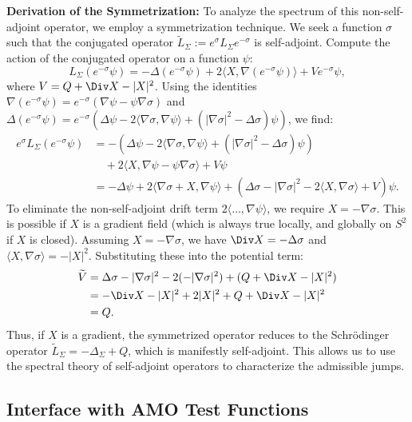 \textbf{Derivation of the Symmetrization:}
To analyze the spectrum of this non-self-adjoint operator, we employ a symmetrization technique. We seek a function $\sigma$ such that the conjugated operator $\widetilde{L}_\Sigma := e^\sigma L_\Sigma e^{-\sigma}$ is self-adjoint.
Compute the action of the conjugated operator on a function $\psi$:
\[
    L_\Sigma(e^{-\sigma}\psi) = -\Delta(e^{-\sigma}\psi) + 2\langle X, \nabla(e^{-\sigma}\psi) \rangle + V e^{-\sigma}\psi,
\]
where $V = Q + \Div X - |X|^2$.
Using the identities $\nabla(e^{-\sigma}\psi) = e^{-\sigma}(\nabla\psi - \psi\nabla\sigma)$ and $\Delta(e^{-\sigma}\psi) = e^{-\sigma}(\Delta\psi - 2\langle\nabla\sigma, \nabla\psi\rangle + (|\nabla\sigma|^2 - \Delta\sigma)\psi)$, we find:
\begin{align*}
    e^\sigma L_\Sigma(e^{-\sigma}\psi) &= -(\Delta\psi - 2\langle\nabla\sigma, \nabla\psi\rangle + (|\nabla\sigma|^2 - \Delta\sigma)\psi) \\
    &\quad + 2\langle X, \nabla\psi - \psi\nabla\sigma \rangle + V\psi \\
    &= -\Delta\psi + 2\langle \nabla\sigma + X, \nabla\psi \rangle + (\Delta\sigma - |\nabla\sigma|^2 - 2\langle X, \nabla\sigma \rangle + V)\psi.
\end{align*}
To eliminate the non-self-adjoint drift term $2\langle \dots, \nabla\psi \rangle$, we require $X = -\nabla\sigma$. This is possible if $X$ is a gradient field (which is always true locally, and globally on $S^2$ if $X$ is closed). Assuming $X = -\nabla\sigma$, we have $\Div X = -\Delta\sigma$ and $\langle X, \nabla\sigma \rangle = -|X|^2$. Substituting these into the potential term:
\begin{align*}
    \widetilde{V} &= \Delta\sigma - |\nabla\sigma|^2 - 2(-|\nabla\sigma|^2) + (Q + \Div X - |X|^2) \\
    &= -\Div X - |X|^2 + 2|X|^2 + Q + \Div X - |X|^2 \\
    &= Q.
\end{align*}
Thus, if $X$ is a gradient, the symmetrized operator reduces to the Schr\"odinger operator $\widetilde{L}_\Sigma = -\Delta_\Sigma + Q$, which is manifestly self-adjoint. This allows us to use the spectral theory of self-adjoint operators to characterize the admissible jumps.

\subsection{Interface with AMO Test Functions}

